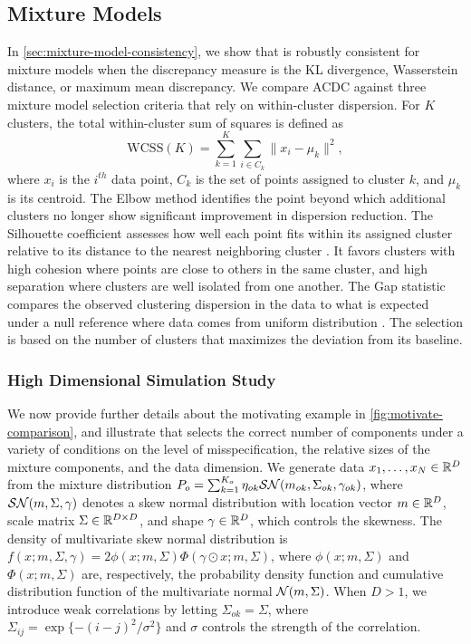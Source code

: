 \subsection{Mixture Models}

In \cref{sec:mixture-model-consistency}, we show that \methodname is robustly consistent for mixture models 
when the discrepancy measure is the KL divergence, Wasserstein distance, or maximum mean discrepancy.
We compare ACDC against three mixture model selection criteria that rely on within-cluster dispersion. For $K$ clusters, the total within-cluster sum of squares is defined as
\[\mathrm{WCSS}(K) = \sum_{k=1}^{K} \sum_{i \in C_k} \| x_i - \mu_k \|^2,\]
where $x_i$ is the $i^{th}$ data point, $C_k$ is the set of points assigned to cluster $k$, and $\mu_k$ is its centroid. 
The Elbow method identifies the point beyond which additional clusters no longer show significant improvement in dispersion reduction. 
The Silhouette coefficient assesses how well each point fits within its assigned cluster relative to its distance to the nearest neighboring cluster \citep{siluet_coef}. It favors clusters with high cohesion where points are close to others in the same cluster, and high separation where clusters are well isolated from one another. 
The Gap statistic compares the observed clustering dispersion in the data to what is expected under a null reference where data comes from uniform distribution \citep{gap_stats}. The selection is based on the number of clusters that maximizes the deviation from its baseline. 

\subsubsection{High Dimensional Simulation Study}
\label{sec:high-dim-simulation}

We now provide further details about the motivating example in \cref{fig:motivate-comparison}, and illustrate
that \methodname selects the correct number of components under a variety of conditions on the level of misspecification,
the relative sizes of the mixture components, and the data dimension.
We generate data $x_1, \ldots,x_{N} \in \mathbb{R}^{D}$ from the mixture distribution
$P_{o} = \sum_{k=1}^{K_{o}}\eta_{ok}\mathcal{SN}(m_{ok}, \Sigma_{ok}, \gamma_{ok})$,
where $\mathcal{SN}(m, \Sigma, \gamma)$ denotes a skew normal distribution with location vector $m \in \mathbb{R}^{D}$, scale matrix $\Sigma \in \mathbb{R}^{D \times D}$,
and shape $\gamma \in \mathbb{R}^{D}$, which controls the skewness.
The density of multivariate skew normal distribution is $f(x; m, \Sigma, \gamma) = 2\phi(x; m, \Sigma)\Phi(\gamma \odot x; m, \Sigma)$, where $\phi(x; m, \Sigma)$ and $\Phi(x; m, \Sigma)$ are, respectively, the probability density function
and cumulative distribution function of the multivariate normal $\mathcal{N}(m, \Sigma)$.
When $D > 1$, we introduce weak correlations by letting $\Sigma_{ok} = \Sigma$,
where $\Sigma_{ij}=\exp\{-(i-j)^2/\sigma^2\}$ and $\sigma$ controls the strength of the correlation.

